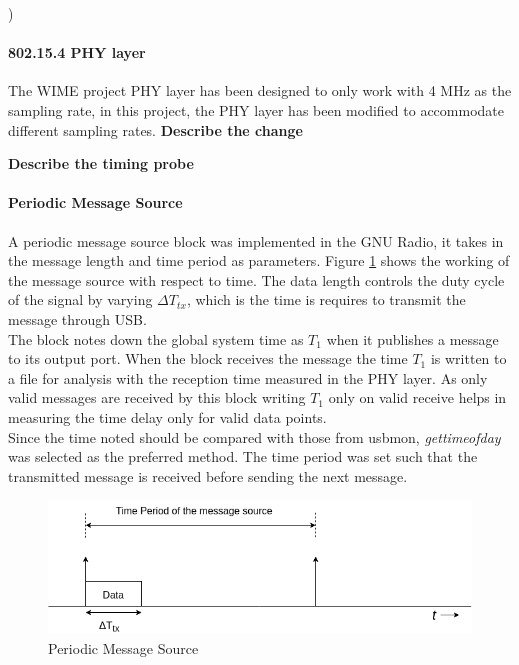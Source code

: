 )

\paragraph{802.15.4 \ac{PHY} layer}

The WIME project \ac{PHY} layer has been designed to only work with 4 MHz as the sampling rate, in this project, the \ac{PHY} layer has been modified to accommodate different sampling rates. \textbf{Describe the change}

\textbf{Describe the timing probe}
\paragraph{Periodic Message Source}

A periodic message source block was implemented in the GNU Radio, it takes in the message length and time period as parameters. Figure \ref{message_source} shows the working of the message source with respect to time. The data length controls the duty cycle of the signal by varying $\Delta T_{tx}$, which is the time is requires to transmit the message through USB.\\

The block notes down the global system time as $T_1$ when it publishes a message to its output port. When the block receives the message the time $T_1$ is written to a file for analysis with the reception time measured in the \ac{PHY} layer. As only valid messages are received by this block writing $T_1$ only on valid receive helps in measuring the time delay only for valid data points.\\

Since the time noted should be compared with those from usbmon, \textit{gettimeofday} was selected as the preferred method. The time period was set such that the transmitted message is received before sending the next message.\\

\begin{figure}[h!]
\centering
\includegraphics[width=\textwidth]{Figure/Message_Source.png}
\caption{Periodic Message Source}
\label{message_source}
\end{figure}


